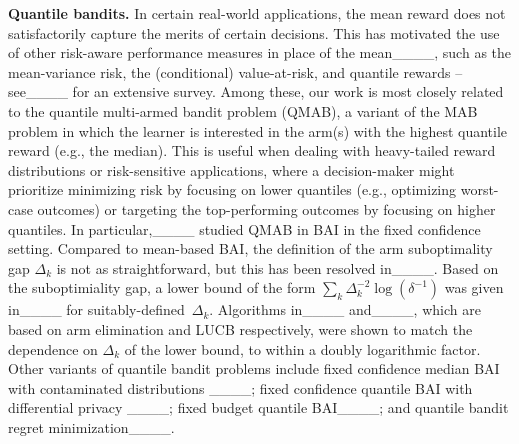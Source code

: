\textbf{Quantile bandits.}
In certain real-world applications, the mean reward does not satisfactorily capture the merits of certain decisions. 
This has motivated the use of other risk-aware performance measures in place of the mean____, such as the mean-variance risk, the (conditional) value-at-risk, and quantile rewards -- see____ for an extensive survey.
Among these, our work is most closely related to
the quantile multi-armed bandit problem (QMAB), a variant of the MAB problem in which the learner is interested in the arm(s) with the highest quantile reward (e.g., the median).
This is useful when dealing with heavy-tailed reward distributions or risk-sensitive applications, where a decision-maker might prioritize minimizing risk by focusing on lower quantiles (e.g., optimizing worst-case outcomes) or targeting the top-performing outcomes by focusing on higher quantiles.
In particular,____ studied QMAB in BAI in the fixed confidence setting. Compared to mean-based BAI, the definition of the arm suboptimality gap $\Delta_k$ is not as straightforward, but this has been resolved in____. Based on the suboptimiality gap, a lower bound of the form $\sum_{k} \Delta_k^{-2} \log(\delta^{-1})$ was given in____ for suitably-defined~$\Delta_k$. 
Algorithms in____ and____, which are based on arm elimination and LUCB respectively, were shown to match the dependence on $\Delta_k$ of the lower bound, to within a doubly logarithmic factor. 
Other variants of quantile bandit problems include
fixed confidence median BAI with contaminated distributions ____;
fixed confidence quantile BAI with differential privacy ____; fixed budget quantile BAI____; and
quantile bandit regret minimization____.

